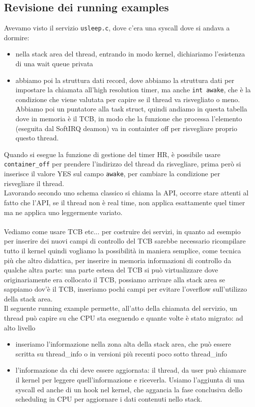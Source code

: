 \documentclass[12pt, oneside]{extbook}
\begin{document}
\subsection*{Revisione dei running examples}
Avevamo visto il servizio \texttt{usleep.c}, dove c'era una syscall dove si andava a dormire:
\begin{itemize}
\item nella stack area del thread, entrando in modo kernel, dichiariamo l'esistenza di una wait queue privata
\item abbiamo poi la struttura dati record, dove abbiamo la struttura dati per impostare la chiamata all'high resolution timer, ma anche \texttt{int awake}, che è la condizione che viene valutata per capire se il thread va risvegliato o meno. Abbiamo poi un puntatore alla task struct, quindi andiamo in questa tabella dove in memoria è il TCB, in modo che la funzione che processa l'elemento (eseguita dal SoftIRQ deamon) va in containter off per risvegliare proprio questo thread.
\end{itemize}
Quando si esegue la funzione di gestione del timer HR, è possibile usare \texttt{container\_off} per prendere l'indirizzo del thread da risvegliare, prima però si inserisce il valore YES sul campo \texttt{awake}, per cambiare la condizione per risvegliare il thread.\\Lavorando secondo uno schema classico si chiama la API, occorre stare attenti al fatto che l'API, se il thread non è real time, non applica esattamente quel timer ma ne applica uno leggermente variato.\\\\Vediamo come usare TCB etc... per costruire dei servizi, in quanto ad esempio per inserire dei nuovi campi di controllo del TCB sarebbe necessario ricompilare tutto il kernel quindi vogliamo la possibilità in maniera semplice, come tecnica più che altro didattica, per inserire in memoria informazioni di controllo da qualche altra parte: una parte estesa del TCB si può virtualizzare dove originariamente era collocato il TCB, possiamo arrivare alla stack area se sappiamo dov'è il TCB, inseriamo pochi campi per evitare l'overflow sull'utilizzo della stack area.\\Il seguente running example permette, all'atto della chiamata del servizio, un thread può capire su che CPU sta eseguendo e quante volte è stato migrato: ad alto livello
\begin{itemize}
\item inseriamo l'informazione nella zona alta della stack area, che può essere scritta su thread\_info o in versioni più recenti poco sotto thread\_info
\item l'informazione da chi deve essere aggiornata: il thread, da user può chiamare il kernel per leggere quell'informazione e riceverla. Usiamo l'aggiunta di una syscall ed anche di un hook nel kernel, che aggancia la fase conclusiva dello scheduling in CPU per aggiornare i dati contenuti nello stack.
\end{itemize}
\end{document}
